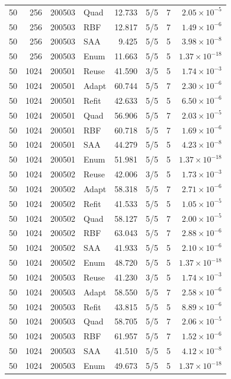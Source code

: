 \begin{longtable}{rrrlrrrr}
50 & 256 & 200503 & Quad & 12.733 & 5/5 & 7 & $2.05\times10^{-5}$\\
50 & 256 & 200503 & RBF & 12.817 & 5/5 & 7 & $1.49\times10^{-6}$\\
50 & 256 & 200503 & SAA & 9.425 & 5/5 & 5 & $3.98\times10^{-8}$\\
50 & 256 & 200503 & Enum & 11.663 & 5/5 & 5 & $1.37\times10^{-18}$\\
50 & 1024 & 200501 & Reuse & 41.590 & 3/5 & 5 & $1.74\times10^{-3}$\\
50 & 1024 & 200501 & Adapt & 60.744 & 5/5 & 7 & $2.30\times10^{-6}$\\
50 & 1024 & 200501 & Refit & 42.633 & 5/5 & 5 & $6.50\times10^{-6}$\\
50 & 1024 & 200501 & Quad & 56.906 & 5/5 & 7 & $2.03\times10^{-5}$\\
50 & 1024 & 200501 & RBF & 60.718 & 5/5 & 7 & $1.69\times10^{-6}$\\
50 & 1024 & 200501 & SAA & 44.279 & 5/5 & 5 & $4.23\times10^{-8}$\\
50 & 1024 & 200501 & Enum & 51.981 & 5/5 & 5 & $1.37\times10^{-18}$\\
50 & 1024 & 200502 & Reuse & 42.006 & 3/5 & 5 & $1.73\times10^{-3}$\\
50 & 1024 & 200502 & Adapt & 58.318 & 5/5 & 7 & $2.71\times10^{-6}$\\
50 & 1024 & 200502 & Refit & 41.533 & 5/5 & 5 & $1.05\times10^{-5}$\\
50 & 1024 & 200502 & Quad & 58.127 & 5/5 & 7 & $2.00\times10^{-5}$\\
50 & 1024 & 200502 & RBF & 63.043 & 5/5 & 7 & $2.88\times10^{-6}$\\
50 & 1024 & 200502 & SAA & 41.933 & 5/5 & 5 & $2.10\times10^{-6}$\\
50 & 1024 & 200502 & Enum & 48.720 & 5/5 & 5 & $1.37\times10^{-18}$\\
50 & 1024 & 200503 & Reuse & 41.230 & 3/5 & 5 & $1.74\times10^{-3}$\\
50 & 1024 & 200503 & Adapt & 58.550 & 5/5 & 7 & $2.58\times10^{-6}$\\
50 & 1024 & 200503 & Refit & 43.815 & 5/5 & 5 & $8.89\times10^{-6}$\\
50 & 1024 & 200503 & Quad & 58.705 & 5/5 & 7 & $2.06\times10^{-5}$\\
50 & 1024 & 200503 & RBF & 61.957 & 5/5 & 7 & $1.52\times10^{-6}$\\
50 & 1024 & 200503 & SAA & 41.510 & 5/5 & 5 & $4.12\times10^{-8}$\\
50 & 1024 & 200503 & Enum & 49.673 & 5/5 & 5 & $1.37\times10^{-18}$\\
\end{longtable}\normalsize
